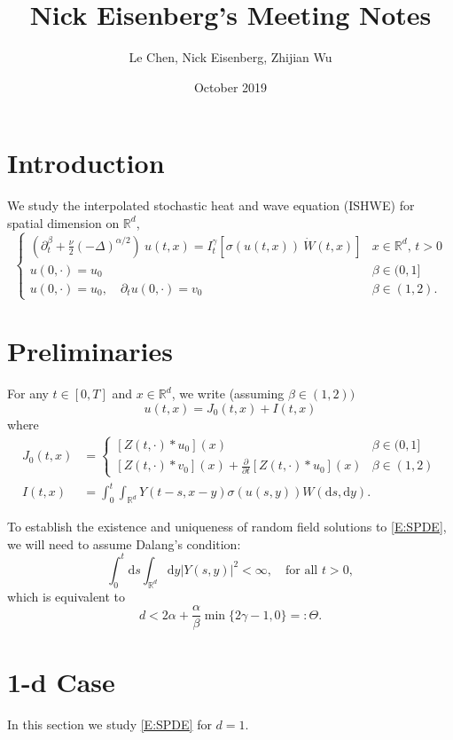 \documentclass[a4paper,11pt]{article}
\title{Nick Eisenberg's Meeting Notes}
\author{Le Chen, Nick Eisenberg, Zhijian Wu}
\date{October 2019}
\numberwithin{equation}{section}
\theoremstyle{plain}
\theoremstyle{definition}
\newcommand{\ud}{\ensuremath{\mathrm{d} }}
\newcommand{\R}{\mathbb{R}}
\numberwithin{NQ}{section}
\numberwithin{LQ}{section}
\numberwithin{ZQ}{section}
\begin{document}
\section{Introduction}
We study the interpolated stochastic heat and wave equation (ISHWE) for spatial dimension on $\R^d$,
	\begin{equation}
	\label{E:SPDE}
	\begin{cases}
	\left(\partial^\beta_t + \frac{\nu}{2}(-\Delta)^{\alpha/2}\right)\: u(t,x) = I^\gamma_t \left[\sigma( u(t,x)) \: \dot W(t,x) \right] & \text{$x\in \R^d$, $t>0$} \\
	u(0,\cdot) = u_0                                                                                                            & \beta \in (0,1]               \\
	u(0,\cdot) = u_0, \quad \partial_t u(0,\cdot) = v_0                                                                            & \beta \in (1,2).
	\end{cases}
	\end{equation}


\section{Preliminaries}
For any $t \in [0,T]$ and $x \in \R^d$, we write (assuming $\beta \in (1,2))$
	\[
		u(t,x) = J_0(t,x) + I(t,x)
	\]
where
	\begin{align*}
		J_0(t,x) &=\begin{cases} 
							[Z(t,\cdot)*u_0](x) & \beta \in (0,1]
						\\	[Z(t,\cdot)*v_0](x) + \frac{\partial}{\partial t}[Z(t,\cdot)*u_0](x) & \beta \in (1,2)
							\end{cases}
	\\	I(t,x) &= \int_0^t \int_{\R^d} Y(t-s,x-y)\sigma(u(s,y)) W(\ud s, \ud y).
				\end{align*}

To establish the existence and uniqueness of random field solutions to \eqref{E:SPDE}, we will need to assume Dalang's condition:
	\begin{equation}
	\label{C:Dalang}
		\int_0^t \ud s \int_{\R^d} \ud y |Y(s,y)|^2 < \infty, \quad \text{for all } t>0,
	\end{equation} 
which is equivalent to
	\begin{equation}
	\label{E:DalangEquiv}
		d < 2\alpha + \frac{\alpha}{\beta}\min\{2\gamma -1, 0\} =: \Theta.
	\end{equation}
\section{1-d Case}
In this section we study \eqref{E:SPDE} for $d=1$. 
\end{document}
